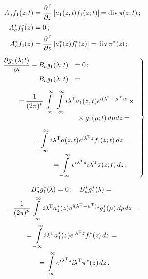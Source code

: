 \begin{multicols}{2}
\noindent
    \begin{align*}
    A_a f_1(z;t)&=\displaystyle\frac{\displaystyle \partial^{\mathrm{T}}\mathstrut}{\displaystyle \partial z\mathstrut} \left[ a_1(z,t) f_1(z;t)\right] =
    \mathrm{div}\, \pi(z;t)\,;
\\
    A_a^* f_1^* (z) &=0\,;\\
    A_a^* f_1(z)&=\displaystyle\frac{\displaystyle \partial^{\mathrm{T}}\mathstrut}{\displaystyle \partial z\mathstrut} \left[ a_1^* (z) f_1^* (z)\right] =
    \mathrm{div}\, \pi^* (z)\,;
    \end{align*}
    \begin{equation}
    \left.
    \begin{array}{rl}
   \displaystyle \fr{\prt g_1 (\la;t)}{\prt t} - B_a g_1(\la;t) &=0\,;\\[9pt]
    B_a g_1(\la;t) &={}\\[9pt]
    &\hspace*{-30mm}{}=   \displaystyle\fr{1}{(2\pi)^p} \iin\iin\! i\la^{\mathrm{T}} a_1(z,t)
    e^{i(\la^{\mathrm{T}}-\mu^{\mathrm{T}})z}\times{}\\[9pt]
    &\hspace*{1mm}{}\times g_1(\mu;t)\, d\mu dz={}\\[9pt]
&\hspace*{-23mm}{}=    \displaystyle\iin i\la^{\mathrm{T}} a(z,t) e^{i\la^{\mathrm{T}}z} f_1(z;t)\, dz={}\\[9pt]
&\hspace*{-12mm}{}=
        \displaystyle\iin e^{i\la^{\mathrm{T}} z} i\la^{\mathrm{T}} \pi(z;t)\, dz\,;
     \end{array}
     \right\}
    \label{e2.32-s}
\end{equation}

    \vspace*{-12pt}

    \noindent
\begin{multline}
B_a^* g_1^* (\lambda)=0\,;\quad
    B_a^* g_1^* (\lambda) = {}\\
    {}=\displaystyle\frac{\displaystyle 1\mathstrut}{\displaystyle (2\pi)^p\mathstrut} \int\limits_{-\infty}^\infty i\lambda^{\mathrm{T}} a_1^* (z)
    e^{i(\lambda^{\mathrm{T}} -\mu^{\mathrm{T}})z} g_1^* (\mu) \,d\mu dz={}\\
\!{}=\int\limits_{-\infty}^\infty\! i\lambda^{\mathrm{T}} a_1^*(z) e^{i\lambda^{\mathrm{T}}z} f_1^* (z)\, dz ={}\\
{}=
    \int\limits_{-\infty}^\infty \!e^{i\lambda^{\mathrm{T}} z} i\lambda^{\mathrm{T}} \pi^* (z)\, dz\,.\!\!
    \label{e2.33-s}
\end{multline}


\end{multicols}
